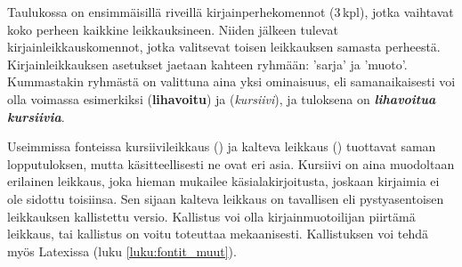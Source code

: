 
Taulukossa on ensimmäisillä riveillä kirjainperhekomennot (3\,kpl),
jotka vaihtavat koko perheen kaikkine leikkauksineen. Niiden jälkeen
tulevat kirjainleikkauskomennot, jotka valitsevat toisen leikkauksen
samasta perheestä. Kirjainleikkauksen asetukset jaetaan kahteen ryhmään:
 'sarja' ja  'muoto'.
Kummastakin ryhmästä on valittuna aina yksi ominaisuus, eli
samanaikaisesti voi olla voimassa esimerkiksi 
(\textbf{lihavoitu}) ja  (\textit{kursiivi}), ja
tuloksena on \textbf{\itshape lihavoitua kursiivia}.

Useimmissa fonteissa kursiivileikkaus () ja
kalteva leikkaus () tuottavat saman
lopputuloksen, mutta käsitteellisesti ne ovat eri asia. Kursiivi on aina
muodoltaan erilainen leikkaus, joka hieman mukailee
käsi\-ala\-kir\-joi\-tusta, joskaan kirjaimia ei ole sidottu toisiinsa.
Sen sijaan kalteva leikkaus on tavallisen eli pys\-ty\-asen\-toi\-sen
leikkauksen kallistettu versio. Kallistus voi olla kirjainmuotoilijan
piirtämä leikkaus, tai kallistus on voitu toteuttaa mekaanisesti.
Kallistuksen voi tehdä myös Latexissa (luku \ref{luku:fontit_muut}).

